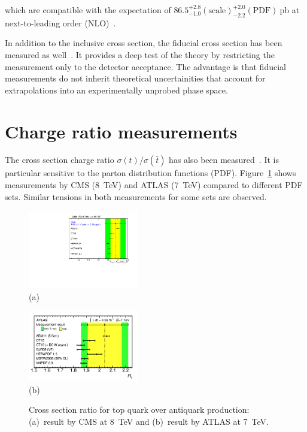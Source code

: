 \documentclass{PoS}
\begin{document}
which are compatible with the expectation of $86.5_{-1.0}^{+2.8}\mathrm{(scale)}_{-2.2}^{+2.0}\mathrm{(PDF)}~\mathrm{pb}$ at next-to-leading order (NLO)~\cite{Kidonakis-8tev}.

In addition to the inclusive cross section, the fiducial cross section has been measured as well~\cite{CMS-PAS-TOP-15-007,atlas-xsec8}. It provides a deep test of the theory by restricting the measurement only to the detector acceptance. The advantage is that fiducial measurements do not inherit theoretical uncertainities that account for extrapolations into an experimentally unprobed phase space.





\section{Charge ratio measurements}
The cross section charge ratio $\sigma(t)/\sigma(\bar{t})$ has also been measured~\cite{atlas-charge7,cms-xsec8}. It is particular sensitive to the parton distribution functions (PDF). Figure~\ref{fig:charge-ratio} shows measurements by CMS (8~TeV) and ATLAS (7~TeV) compared to different PDF sets. Similar tensions in both measurements for some sets are observed. 

\begin{figure}[htbp]
\begin{center}
\parbox[t]{0.45\textwidth}{\centering\includegraphics[width=0.43\textwidth]{cms_xsec8/charge.pdf}\\(a)}
\parbox[t]{0.45\textwidth}{\centering\includegraphics[width=0.43\textwidth]{atlas_charge7/charge.pdf}\\(b)}
\end{center}
\caption{\label{fig:charge-ratio}Cross section ratio for top quark over antiquark production: (a)~result by CMS at 8~TeV and (b)~result by ATLAS at 7~TeV.}

\end{figure}
\end{document}
